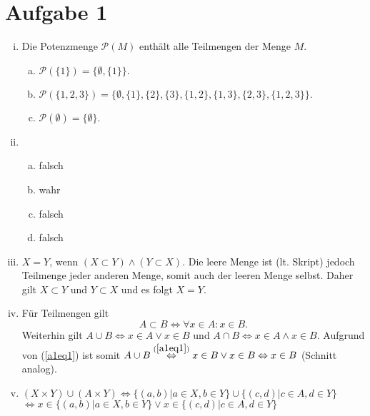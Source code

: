 \documentclass[12pt,a4paper]{article}
\begin{document}
\section*{Aufgabe 1}

\begin{enumerate}[(i)]
    \item Die Potenzmenge $\mathcal{P}(M)$ enthält alle Teilmengen der Menge $M$. \begin{enumerate}[a)]
        \item $\mathcal{P}(\{1\}) = \{\emptyset, \{1\}\}.$
        \item $\mathcal{P}(\{1, 2, 3\}) = \{\emptyset, \{1\}, \{2\}, \{3\}, \{1, 2\}, \{1, 3\}, \{2, 3\}, \{1, 2, 3\}\}.$
        \item $\mathcal{P}(\emptyset) = \{\emptyset\}.$
    \end{enumerate}

    \item \begin{enumerate}[a)]
        \item falsch
        \item wahr
        \item falsch
        \item falsch
    \end{enumerate}

    \item $X = Y$, wenn $(X \subset Y) \wedge (Y \subset X).$ Die leere Menge ist (lt. Skript) jedoch Teilmenge jeder anderen Menge, somit auch der leeren Menge selbst. Daher gilt $X \subset Y$ und $Y \subset X$ und es folgt $X = Y$.

    \item Für Teilmengen gilt
    \begin{equation}
    \label{a1eq1}
    A \subset B \Leftrightarrow \forall x \in A: x \in B.
    \end{equation}
    Weiterhin gilt $A \cup B \Leftrightarrow x \in A \vee x \in B$ und $A \cap B \Leftrightarrow x \in A \wedge x \in B.$
    Aufgrund von (\ref*{a1eq1}) ist somit $A \cup B \overset{(\ref{a1eq1})}{\Leftrightarrow} x \in B \vee x \in B \Leftrightarrow x \in B$ (Schnitt analog).

    \item $(X \times Y) \cup (A \times Y) \Leftrightarrow \{(a, b) | a \in X, b \in Y\} \cup \{(c, d) | c \in A, d \in Y\}$\\
    $\Leftrightarrow x \in \{(a, b) | a \in X, b \in Y\} \vee x \in \{(c, d) | c \in A, d \in Y\}$
\end{enumerate}
\end{document}
